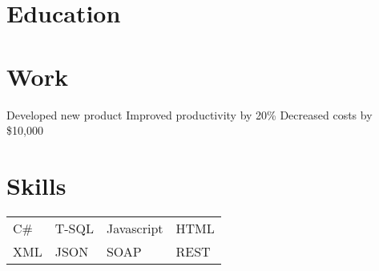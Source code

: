 \documentclass{moderncv}
\begin{document}
 
	
	 
	\section{Education}
	 
	\section{Work}
	\workitems
	{Developed new product}
	{Improved productivity by 20\%}
	{Decreased costs by \$10,000}
	
	\section{Skills}
	\begin{tabular}{l l l l}
        C\# & T-SQL & Javascript & HTML \\
		XML & JSON & SOAP & REST
	\end{tabular}
 
\end{document}
